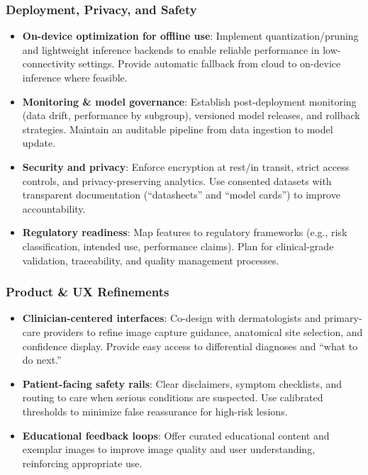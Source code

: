 \documentclass[
  12pt,
  oneside]{article}
\providecommand{\tightlist}{%
  \setlength{\itemsep}{0pt}\setlength{\parskip}{0pt}}
\begin{document}
\subsubsection{Deployment, Privacy, and
Safety}\label{deployment-privacy-and-safety}

\begin{itemize}
\tightlist
\item
  \textbf{On-device optimization for offline use}: Implement
  quantization/pruning and lightweight inference backends to enable
  reliable performance in low-connectivity settings. Provide automatic
  fallback from cloud to on-device inference where feasible.
\item
  \textbf{Monitoring \& model governance}: Establish post-deployment
  monitoring (data drift, performance by subgroup), versioned model
  releases, and rollback strategies. Maintain an auditable pipeline from
  data ingestion to model update.
\item
  \textbf{Security and privacy}: Enforce encryption at rest/in transit,
  strict access controls, and privacy-preserving analytics. Use
  consented datasets with transparent documentation (``datasheets'' and
  ``model cards'') to improve accountability.
\item
  \textbf{Regulatory readiness}: Map features to regulatory frameworks
  (e.g., risk classification, intended use, performance claims). Plan
  for clinical-grade validation, traceability, and quality management
  processes.
\end{itemize}

\subsubsection{Product \& UX Refinements}\label{product-ux-refinements}

\begin{itemize}
\tightlist
\item
  \textbf{Clinician-centered interfaces}: Co-design with dermatologists
  and primary-care providers to refine image capture guidance,
  anatomical site selection, and confidence display. Provide easy access
  to differential diagnoses and ``what to do next.''
\item
  \textbf{Patient-facing safety rails}: Clear disclaimers, symptom
  checklists, and routing to care when serious conditions are suspected.
  Use calibrated thresholds to minimize false reassurance for high-risk
  lesions.
\item
  \textbf{Educational feedback loops}: Offer curated educational content
  and exemplar images to improve image quality and user understanding,
  reinforcing appropriate use.
\end{itemize}
\end{document}
